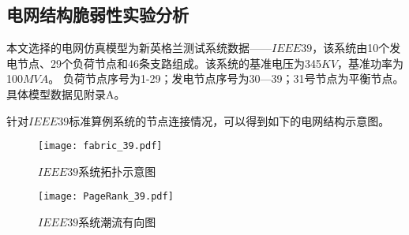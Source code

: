 \subsection{电网结构脆弱性实验分析}
\label{sec:singleAnalysis_fabric}
本文选择的电网仿真模型为新英格兰测试系统数据——$IEEE39$，该系统由10个发电节点、29个负荷节点和46条支路组成。该系统的基准电压为345$KV$，基准功率为100$MVA$。
负荷节点序号为1-29；发电节点序号为30—39；31号节点为平衡节点。具体模型数据见附录A。

针对$IEEE39$标准算例系统的节点连接情况，可以得到如下的电网结构示意图。
\begin{figure}[H] %
  \centering
  \texttt{[image: fabric\_39.pdf]}
  \caption{$IEEE39$系统拓扑示意图}
  \label{fig:fabric_39}
\end{figure}

\begin{figure}[H] %
  \centering
  \texttt{[image: PageRank\_39.pdf]}
  \caption{$IEEE39$系统潮流有向图}
  \label{fig:PageRank_39}
\end{figure}


